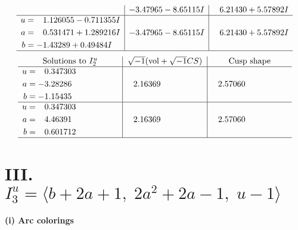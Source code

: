 \documentclass[1p]{elsarticle_modified}
\theoremstyle{definition}
\newcommand{\I}{\sqrt{-1}}
\begin{document}
$$\begin{array}{c|c|c}
 & -3.47965 - 8.65115 I & \phantom{-}6.21430 + 5.57892 I \\ \hline\begin{aligned}
u &= \phantom{-}1.126055 - 0.711355 I \\
a &= \phantom{-}0.531471 + 1.289216 I \\
b &= -1.43289 + 0.49484 I\end{aligned}
 & -3.47965 - 8.65115 I & \phantom{-}6.21430 + 5.57892 I\\
 \hline 
 \end{array}$$\newpage$$\begin{array}{c|c|c}  
\text{Solutions to }I^u_{2}& \I (\text{vol} + \sqrt{-1}CS) & \text{Cusp shape}\\
 \hline 
\begin{aligned}
u &= \phantom{-}0.347303\phantom{ +0.000000I} \\
a &= -3.28286\phantom{ +0.000000I} \\
b &= -1.15435\phantom{ +0.000000I}\end{aligned}
 & \phantom{-}2.16369\phantom{ +0.000000I} & \phantom{-}2.57060\phantom{ +0.000000I} \\ \hline\begin{aligned}
u &= \phantom{-}0.347303\phantom{ +0.000000I} \\
a &= \phantom{-}4.46391\phantom{ +0.000000I} \\
b &= \phantom{-}0.601712\phantom{ +0.000000I}\end{aligned}
 & \phantom{-}2.16369\phantom{ +0.000000I} & \phantom{-}2.57060\phantom{ +0.000000I}\\
 \hline 
 \end{array}$$\newpage\newpage\renewcommand{\arraystretch}{1}
\centering \section*{III. $I^u_{3}= \langle b+2 a+1,\;2 a^2+2 a-1,\;u-1 \rangle$}
\flushleft \textbf{(i) Arc colorings}\\
\end{document}
